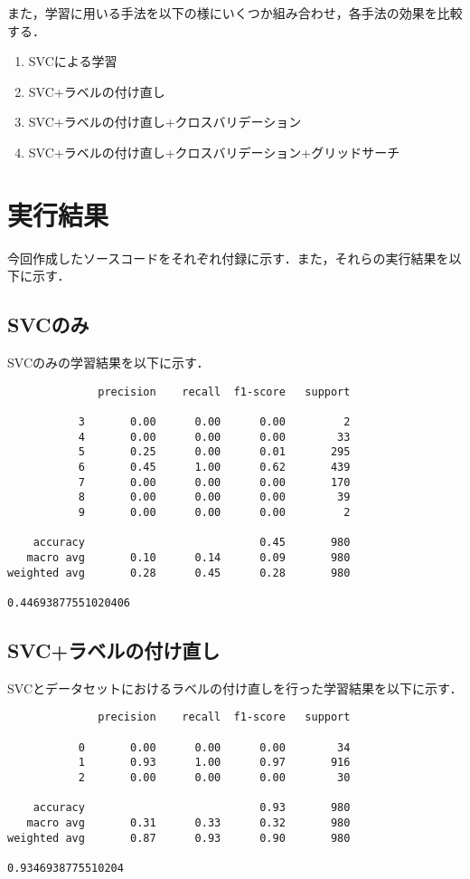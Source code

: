 \documentclass[a4paper, titlepage]{jsarticle}
\begin{document}
	また，学習に用いる手法を以下の様にいくつか組み合わせ，各手法の効果を比較する．
	\begin{enumerate}
		\item SVCによる学習
		\item SVC+ラベルの付け直し
		\item SVC+ラベルの付け直し+クロスバリデーション
		\item SVC+ラベルの付け直し+クロスバリデーション+グリッドサーチ
	\end{enumerate}

	\section{実行結果}
	今回作成したソースコードをそれぞれ付録に示す．また，それらの実行結果を以下に示す．

	\subsection{SVCのみ}
	SVCのみの学習結果を以下に示す．

	\begin{lstlisting}
              precision    recall  f1-score   support

           3       0.00      0.00      0.00         2
           4       0.00      0.00      0.00        33
           5       0.25      0.00      0.01       295
           6       0.45      1.00      0.62       439
           7       0.00      0.00      0.00       170
           8       0.00      0.00      0.00        39
           9       0.00      0.00      0.00         2

    accuracy                           0.45       980
   macro avg       0.10      0.14      0.09       980
weighted avg       0.28      0.45      0.28       980

0.44693877551020406
	\end{lstlisting}

	\subsection{SVC+ラベルの付け直し}
	SVCとデータセットにおけるラベルの付け直しを行った学習結果を以下に示す．

	\begin{lstlisting}
              precision    recall  f1-score   support

           0       0.00      0.00      0.00        34
           1       0.93      1.00      0.97       916
           2       0.00      0.00      0.00        30

    accuracy                           0.93       980
   macro avg       0.31      0.33      0.32       980
weighted avg       0.87      0.93      0.90       980

0.9346938775510204
	\end{lstlisting}
\end{document}
